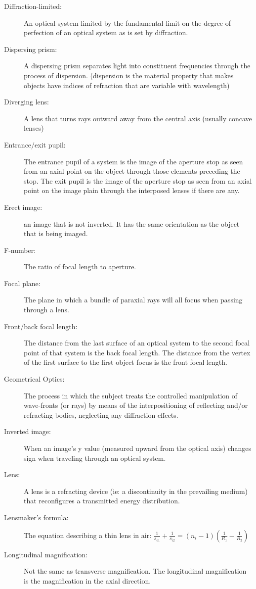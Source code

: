 \documentclass[12pt]{report}
\begin{document}
\begin{description}
\item[Diffraction-limited: ] An optical system limited by the fundamental limit on the degree of perfection of an optical system as is set by diffraction. 
\item[Dispersing prism: ] A dispersing prism separates light into constituent frequencies through the process of dispersion. (dispersion is the material property that makes objects have indices of refraction that are variable with wavelength)
\item[Diverging lens: ] A lens that turns rays outward away from the central axis (usually concave lenses)
\item[Entrance/exit pupil: ] The entrance pupil of a system is the image of the aperture stop as seen from an axial point on the object through those elements preceding the stop. The exit pupil is the image of the aperture stop as seen from an axial point on the image plain through the interposed lenses if there are any. 
\item[Erect image: ] an image that is not inverted. It has the same orientation as the object that is being imaged. 
\item[F-number: ] The ratio of focal length to aperture. 
\item[Focal plane: ] The plane in which a bundle of paraxial rays will all focus when passing through a lens. 
\item[Front/back focal length: ] The distance from the last surface of an optical system to the second focal point of that system is the back focal length. The distance from the vertex of the first surface to the first object focus is the front focal length. 
\item[Geometrical Optics: ] The process in which the subject treats the controlled manipulation of wave-fronts (or rays) by means of the interpositioning of reflecting and/or refracting bodies, neglecting any diffraction effects. 
\item[Inverted image: ] When an image's y value (measured upward from the optical axis) changes sign when traveling through an optical system. 
\item[Lens: ] A lens is a refracting device (ie: a discontinuity in the prevailing medium) that reconfigures a transmitted energy distribution.
\item[Lensmaker's formula: ] The equation describing a thin lens in air: $\frac{1}{s_{o1}}+\frac{1}{s_{i2}} = (n_i-1)\left(\frac{1}{R_1}-\frac{1}{R_2}\right) $
\item[Longitudinal magnification: ] Not the same as transverse magnification. The longitudinal magnification is the magnification in the axial direction. 

\end{description}
\end{document}
